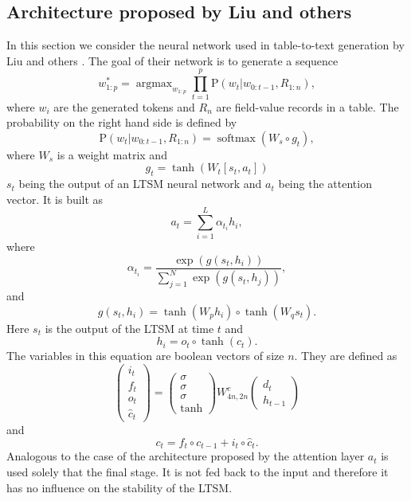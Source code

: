 \documentclass{article}
\DeclareMathOperator*{\argmax}{argmax}
\DeclareMathOperator*{\smax}{softmax}
\numberwithin{equation}{section}
\begin{document}
\subsection{Architecture proposed by Liu and others}
In this section we consider the neural network used in table-to-text
generation by Liu and others \cite{liu2018table}. The goal of their
network is to generate a sequence
\begin{equation}\label{s10e12}
w^\ast_{1:p} = \argmax_{w_{1:p}}\prod_{t=1}^p\mathrm{P}(w_t | w_{0:t-1}, 
	R_{1:n}),
\end{equation}
where $w_i$ are the generated tokens and $R_n$ are field-value records in a
table. The probability on the right hand side is defined by
\begin{equation}\label{s10e13}
\mathrm{P}(w_t| w_{0:t-1}, R_{1:n}) = \smax(W_s \circ g_t),
\end{equation}
where $W_s$ is a weight matrix and
\begin{equation}\label{s10e14}
g_t = \tanh(W_t[s_t, a_t])
\end{equation}
$s_t$ being the output of an LTSM neural network and $a_t$ being the 
attention vector. It is built as
\begin{equation}\label{s10e15}
a_t = \sum_{i=1}^L \alpha_{t_i}h_i,
\end{equation}
where
\begin{equation}\label{s10e16}
\alpha_{t_i} = \frac{\exp(g(s_t, h_i))}{\sum_{j=1}^N\exp(g(s_t, h_j))},
\end{equation}
and
\begin{equation}\label{s10e17}
g(s_t, h_i) = \tanh(W_p h_i) \circ \tanh(W_q s_t).
\end{equation}
Here $s_t$ is the output of the LTSM at time $t$ and 
\begin{equation}\label{s10e18}
h_i = o_t \circ \tanh(c_t).
\end{equation}
The variables in this equation are boolean vectors of size $n$. They 
are defined as
\begin{equation}\label{s10e19}
\begin{pmatrix}i_t \\ f_t \\ o_t \\ \hat{c}_t \end{pmatrix} = 
\begin{pmatrix}\sigma \\ \sigma \\ \sigma \\ \tanh\end{pmatrix}
W_{4n, 2n}^c\begin{pmatrix}d_t \\ h_{t-1} \end{pmatrix}
\end{equation}
and
\begin{equation}\label{s10e20}
c_t = f_t \circ c_{t-1} + i_t \circ \hat{c}_t.
\end{equation}
Analogous to the case of the architecture proposed by \cite{ran2019lstm}
the attention layer $a_t$ is used solely that the final stage. It is not
fed back to the input and therefore it has no influence on the stability
of the LTSM.
\end{document}
